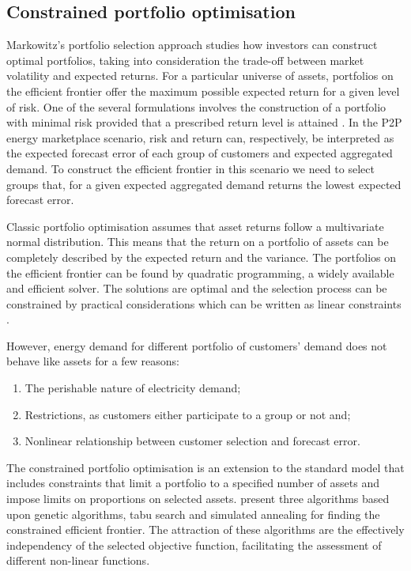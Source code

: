 \documentclass[review, 3p, 12pt, authoryear]{elsarticle}
\begin{document}
\subsection{Constrained portfolio optimisation}
\label{ss:sdevgrp}
Markowitz’s portfolio selection approach studies how investors can construct optimal portfolios, taking into consideration the trade-off between market volatility and expected returns.
For a particular universe of assets, portfolios on the efficient frontier offer the maximum possible expected return for a given level of risk.
One of the several formulations involves the construction of a portfolio with minimal risk provided that a prescribed return level is attained \citep{bonami2009portopt}.
In the P2P energy marketplace scenario, risk and return can, respectively, be interpreted as the expected forecast error of each group of customers and expected aggregated demand.
To construct the efficient frontier in this scenario we need to select groups that, for a given expected aggregated demand returns the lowest expected forecast error.

Classic portfolio optimisation assumes that asset returns follow a multivariate normal distribution.
This means that the return on a portfolio of assets can be completely described by the expected return and the variance.
The portfolios on the efficient frontier can be found by quadratic programming, a widely available and efficient solver.
The solutions are optimal and the selection process can be constrained by practical considerations which can be written as linear constraints \citep{CHANG20001271}.

However, energy demand for different portfolio of customers' demand does not behave like assets for a few reasons:
\begin{enumerate}
   \item The perishable nature of electricity demand;
   \item Restrictions, as customers either participate to a group or not and;
   \item Nonlinear relationship between customer selection and forecast error.
\end{enumerate}

The constrained portfolio optimisation is an extension to the standard model that includes constraints that limit a portfolio to a specified number of assets and impose limits on proportions on selected assets.
\citet{CHANG20001271} present three algorithms based upon genetic algorithms, tabu search and simulated annealing for finding the constrained efficient frontier.
The attraction of these algorithms are the effectively independency of the selected objective function, facilitating the assessment of different non-linear functions.
\end{document}
